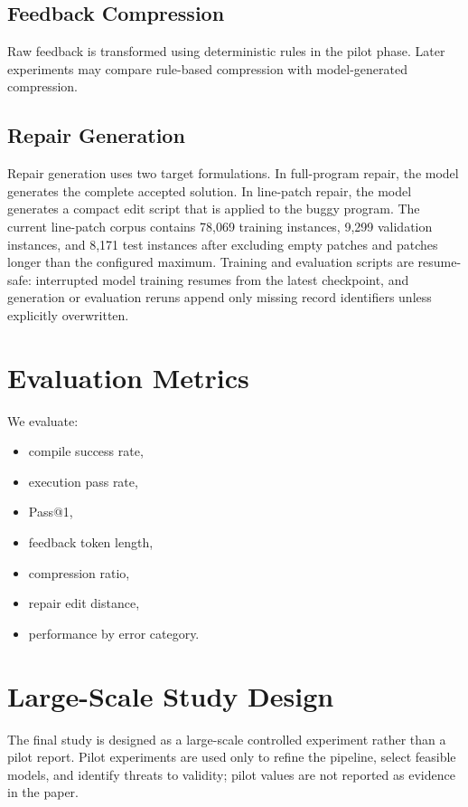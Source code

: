 \documentclass[conference]{IEEEtran}
\begin{document}
\subsection{Feedback Compression}

Raw feedback is transformed using deterministic rules in the pilot phase. Later experiments may compare rule-based compression with model-generated compression.

\subsection{Repair Generation}

Repair generation uses two target formulations. In full-program repair, the model generates the complete accepted solution. In line-patch repair, the model generates a compact edit script that is applied to the buggy program. The current line-patch corpus contains 78,069 training instances, 9,299 validation instances, and 8,171 test instances after excluding empty patches and patches longer than the configured maximum. Training and evaluation scripts are resume-safe: interrupted model training resumes from the latest checkpoint, and generation or evaluation reruns append only missing record identifiers unless explicitly overwritten.

\section{Evaluation Metrics}

We evaluate:

\begin{itemize}
    \item compile success rate,
    \item execution pass rate,
    \item Pass@1,
    \item feedback token length,
    \item compression ratio,
    \item repair edit distance,
    \item performance by error category.
\end{itemize}

\section{Large-Scale Study Design}

The final study is designed as a large-scale controlled experiment rather than a pilot report. Pilot experiments are used only to refine the pipeline, select feasible models, and identify threats to validity; pilot values are not reported as evidence in the paper.
\end{document}
